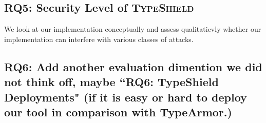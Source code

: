 \subsection{RQ5: Security Level of \textsc{TypeShield}}
\label{section:mitiagtion}
We look at our implementation conceptually and assess qualitatievly whether our implementation can interfere with various classes of attacks. 

\subsection{RQ6: Add another evaluation dimention we did not think off, maybe ``RQ6: TypeShield Deployments" (if it is easy or hard to deploy our tool in
comparison with TypeArmor.)}
\label{section:mitiagtion}

% 
% 
